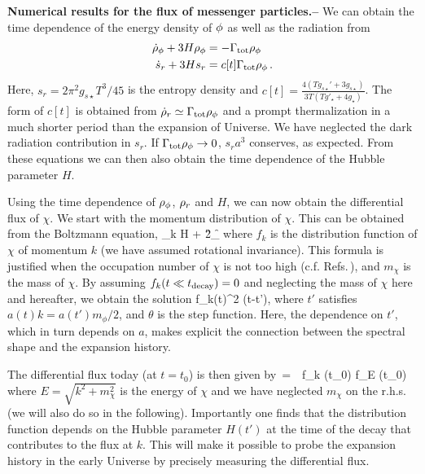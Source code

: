 \documentclass[superscriptaddress,aps,preprintnumbers,amsmath,showpacs,amssymb,prd,nofootinbib,reprint]{revtex4-1}
\begin{document}
{\bf Numerical results for the flux of messenger particles.--} We can obtain the time dependence of the energy density of $\phi$ as well as the radiation from
\begin{align}
\laq{1}
\dot{\rho}_\f+3H\rho_\f  &= -\G_{\rm tot} \rho_\f \\
\laq{2}\dot{s}_r+3H s_r &= c[t] \G_{\rm tot} \rho_\f \,.
\end{align}
Here, $s_r=2\pi^2g_{s\star}T^3/45$ is the entropy density and
$c[t]= \frac{4\left(T g_{s\star}'+3 g_{s\star}\right)}{3 T \left(T g'_\star+4 g_\star\right)}$.  The form of $c[t]$ is obtained from $\dot{\rho}_r \simeq \Gamma_{\rm tot} \rho_\phi $ and a prompt thermalization in a much shorter period than the expansion of Universe. We have neglected the dark radiation contribution in $s_r$.
If $\Gamma_{\rm tot} \rho_\phi\to 0$, $s_r a^3$ conserves, as expected. 
From these equations we can then also obtain the time dependence of the Hubble parameter $H$. 

Using the time dependence of $\rho_\phi$, $\rho_r$ and $H$,  we can now obtain the differential flux of $\chi$. 
We start with the momentum distribution of $\chi$. This can be  obtained from the Boltzmann equation,
\beq
{}_k \approx  H + 2\G_{\f \to \chi\chi} 
\eeq
 where $f_k$ is the distribution function of $\chi$ of momentum $k$ (we have assumed rotational invariance). 
 This formula is justified when the occupation number of $\chi$ is not too high (c.f. Refs.\,\cite{Moroi:2020has, Moroi:2020bkq}), and $m_\chi$ is the mass of $\chi$. 
By assuming $f_k(t\ll t_{\rm decay})=0$ and neglecting the mass of $\chi$ here and hereafter, we obtain the solution 
\beq
{}
f_k(t)\pi^2 \theta(t-t'),
\eeq
where $t'$ satisfies $a(t) k = a(t') m_\phi/2$, and $\theta$ is the step function.  
 Here, the dependence on $t'$, which in turn depends on $a$, makes explicit the connection between the spectral shape and the expansion history.

The differential flux today (at $t=t_0$) is then given by 
\beq
{}
 \,=\,\  f_k (t_0) \simeq  {}f_E (t_0)
\eeq
where $E=\sqrt{k^2+m_\chi^2}$ is the energy of $\chi$ and we have neglected $m_\chi$ on the r.h.s. (we will also do so in the following).
Importantly one finds that the distribution function depends on the Hubble parameter $H(t')$ at the time of the decay that contributes to the flux at $k$. This will make it possible to probe the expansion history in the early Universe by precisely measuring the differential flux. 
\end{document}
